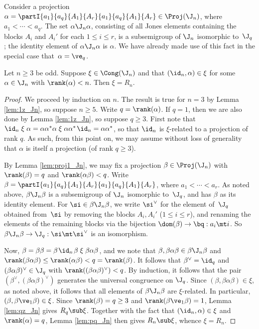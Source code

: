 Consider a projection $\alpha=\partI{a_1}{a_q}{A_1}{A_r}{a_1}{a_q}{A_1}{A_r}\in \Proj(\J_n)$, where $a_1<\cdots<a_q$.  The set $\alpha\J_n\alpha$, consisting of all Jones elements containing the blocks $A_i$ and $A_i'$ for each $1\leq i\leq r$, is a subsemigroup of $\J_n$ isomorphic to~$\J_q$; the identity element of $\alpha\J_n\alpha$ is $\alpha$.  We have already made use of this fact in the special case that~$\alpha=\ve_q$.




\begin{lemma}
\label{lem:1q_Jn}
Let $n\geq3$ be odd.  Suppose $\xi\in\Cong(\J_n)$ and that $(\id_n,\alpha)\in\xi$ for some $\alpha\in\J_n$ with $\rank(\alpha)<n$.  Then $\xi=R_n$.
\end{lemma}

\begin{proof} We proceed by induction on $n$.  The result is true for $n=3$ by Lemma
    \ref{lem:1z_Jn}, so suppose $n\geq5$.  Write $q=\rank(\alpha)$.  If
    $q=1$, then we are also done by Lemma \ref{lem:1z_Jn}, so suppose
    $q\geq3$.  First note that $\id_n \mathrel\xi \alpha = \alpha\alpha^*\alpha \mathrel\xi \alpha\alpha^*\;\!\id_n = \alpha\alpha^*$,
so that $\id_n$ is $\xi$-related to a projection of rank $q$.  As such, from this point on, we may assume without loss of generality that $\alpha$ is itself a projection (of rank $q\geq3$).

By Lemma \ref{lem:proj1_Jn}, we may fix a projection $\beta\in \Proj(\J_n)$ with $\rank(\beta)=q$ and $\rank(\alpha\beta)<q$.  Write $\beta=\partI{a_1}{a_q}{A_1}{A_r}{a_1}{a_q}{A_1}{A_r}$, where $a_1<\cdots<a_r$.  As noted above, $\beta\J_n\beta$ is a subsemigroup of $\J_n$ isomorphic to~$\J_q$, and has $\beta$ as its identity element.  For $\si\in\beta\J_n\beta$, we write $\si^\vee$ for the element of~$\J_q$ obtained from~$\si$ by removing the blocks $A_i,A_i'$ ($1\leq i\leq r$), and renaming the elements of the remaining blocks via the bijection $\dom(\beta)\to\bq:a_i\mt i$.  So $\beta\J_n\beta\to\J_q:\si\mt\si^\vee$ is an isomorphism.

Now, $\beta=\beta\beta=\beta\;\!\id_n\;\!\beta \mathrel\xi \beta\alpha\beta$, and we note that $\beta,\beta\alpha\beta\in\beta\J_n\beta$ and $\rank(\beta\alpha\beta)\leq\rank(\alpha\beta)<q=\rank(\beta)$.  It follows that $\beta^\vee=\id_q$ and $(\beta\alpha\beta)^\vee\in\J_q$ with ${\rank((\beta\alpha\beta)^\vee)<q}$.
By induction, it follows that the pair $(\beta^\vee,(\beta\alpha\beta)^\vee)$ generates the universal congruence on $\J_q$.  Since $(\beta,\beta\alpha\beta)\in\xi$, as noted above, it follows that all elements of $\beta\J_n\beta$ are $\xi$-related.  In particular, $(\beta,\beta\ve_1\beta)\in\xi$.  Since $\rank(\beta)=q\geq3$ and $\rank(\beta\ve_1\beta)=1$, Lemma \ref{lem:qz_Jn} gives $R_q\sub\xi$.  Together with the fact that $(\id_n,\alpha)\in\xi$ and $\rank(\alpha)=q$, Lemma \ref{lem:pq_Jn} then gives $R_n\sub\xi$, whence $\xi=R_n$. \end{proof}



